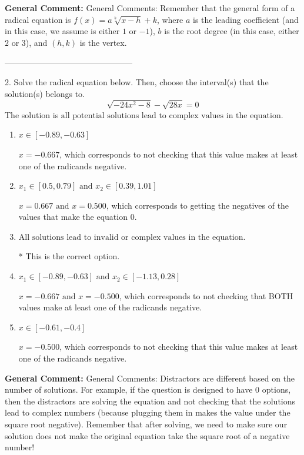 \documentclass{extbook}[14pt]
\begin{document}
\textbf{General Comment:} General Comments: Remember that the general form of a radical equation is $ f(x) = a \sqrt[b]{x - h} + k$, where $a$ is the leading coefficient (and in this case, we assume is either $1$ or $-1$), $b$ is the root degree (in this case, either $2$ or $3$), and $(h, k)$ is the vertex. 

-----------------------------------------------

2. Solve the radical equation below. Then, choose the interval(s) that the solution(s) belongs to.
\[ \sqrt{-24 x^2 - 8} - \sqrt{28 x} = 0 \] 
The solution is $ \text{all potential solutions lead to complex values in the equation.} $ 

\begin{enumerate}[label=\Alph*.] 
\item $ x \in [-0.89,-0.63] $ 

 $x = -0.667$, which corresponds to not checking that this value makes at least one of the radicands negative. 
\item $ x_1 \in [0.5, 0.79] \text{ and } x_2 \in [0.39,1.01] $ 

 $x = 0.667 \text{ and } x = 0.500$, which corresponds to getting the negatives of the values that make the equation 0. 
\item $ \text{All solutions lead to invalid or complex values in the equation.} $ 

 * This is the correct option. 
\item $ x_1 \in [-0.89, -0.63] \text{ and } x_2 \in [-1.13,0.28] $ 

 $x = -0.667 \text{ and } x = -0.500$, which corresponds to not checking that BOTH values make at least one of the radicands negative. 
\item $ x \in [-0.61,-0.4] $ 

 $x = -0.500$, which corresponds to not checking that this value makes at least one of the radicands negative. 
\end{enumerate} 
 
\textbf{General Comment:} General Comments: Distractors are different based on the number of solutions. For example, if the question is designed to have 0 options, then the distractors are solving the equation and not checking that the solutions lead to complex numbers (because plugging them in makes the value under the square root negative). Remember that after solving, we need to make sure our solution does not make the original equation take the square root of a negative number! 
\end{document}
